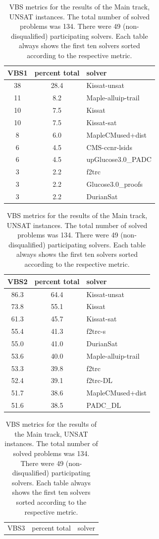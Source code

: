 \documentclass{elsarticle}
\begin{document}
\begin{table}
\caption{VBS metrics for the results of the Main track, UNSAT instances. 
The total number of solved problems was 134. 
There were 49 (non-disqualified) participating solvers.
Each table always shows the first ten solvers sorted according to the respective metric.}
\label{tab:vbsMainUNSAT}
\begin{center}
\begin{tabular}{ccl}
VBS1 & percent total & solver \\
\hline
38 & 28.4 & Kissat-unsat \\
11 & \phantom{0}8.2 & Maple-alluip-trail \\
10 & \phantom{0}7.5 & Kissat \\
10 & \phantom{0}7.5 & Kissat-sat \\
\phantom{0}8 & \phantom{0}6.0 & MapleCMused+dist \\
\phantom{0}6 & \phantom{0}4.5 & CMS-ccnr-lsids \\
\phantom{0}6 & \phantom{0}4.5 & upGlucose3.0\_PADC \\
\phantom{0}3 & \phantom{0}2.2 & f2trc \\
\phantom{0}3 & \phantom{0}2.2 & Glucose3.0\_proofs \\
\phantom{0}3 & \phantom{0}2.2 & DurianSat \\
\end{tabular}
\end{center}
\begin{center}
\begin{tabular}{ccl}
VBS2 & percent total & solver \\
\hline
86.3 & 64.4 & Kissat-unsat \\
73.8 & 55.1 & Kissat \\
61.3 & 45.7 & Kissat-sat \\
55.4 & 41.3 & f2trc-s \\
55.0 & 41.0 & DurianSat \\
53.6 & 40.0 & Maple-alluip-trail \\
53.3 & 39.8 & f2trc \\
52.4 & 39.1 & f2trc-DL \\
51.7 & 38.6 & MapleCMused+dist \\
51.6 & 38.5 & PADC\_DL \\
\end{tabular}
\end{center}
\begin{center}
\begin{tabular}{ccl}
VBS3 & percent total & solver \\

\end{tabular}
\end{center}
\end{table}
\end{document}
